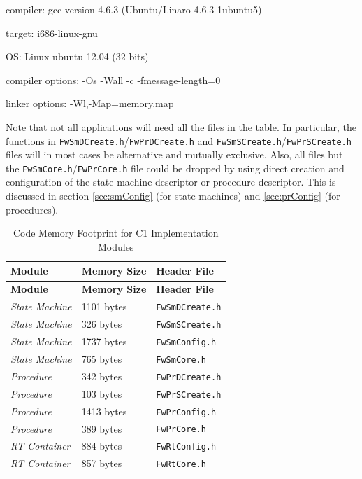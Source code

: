 \documentclass[a4paper,10pt]{article}
\newenvironment{fw_itemize}						%
{\begin{itemize}
  \setlength{\itemsep}{1mm}
  \setlength{\parskip}{0pt}
  \setlength{\parsep}{0pt}}
{\end{itemize}}
\begin{document}
\begin{fw_itemize}
\item{compiler}: gcc version 4.6.3 (Ubuntu/Linaro 4.6.3-1ubuntu5)
\item{target}: i686-linux-gnu
\item{OS}: Linux ubuntu 12.04 (32 bits)
\item{compiler options}: -Os -Wall -c -fmessage-length=0
\item{linker options}: -Wl,-Map=memory.map
\end{fw_itemize}

Note that not all applications will need all the files in the table. In particular, the functions in \texttt{FwSmDCreate.h}/\texttt{FwPrDCreate.h} and \texttt{FwSmSCreate.h}/\texttt{FwPrSCreate.h} files will in 
most cases be alternative and mutually exclusive. Also, all files but 
the \texttt{FwSmCore.h}/\texttt{FwPrCore.h} file could be dropped by using direct creation and configuration of 
the state machine descriptor or procedure descriptor. This is discussed in section \ref{sec:smConfig} (for
state machines) and \ref{sec:prConfig} (for procedures).

\begin{longtable}{|p{2.7cm}|p{2.7cm}|p{2.7cm}|}
\caption{Code Memory Footprint for C1 Implementation Modules} \label{tab:memFootprint}\\
\rowcolor{light-gray}
\textbf{Module} & \textbf{Memory Size} & \textbf{Header File} \\
\hline\hline
\endfirsthead
\rowcolor{light-gray}
\textbf{Module} & \textbf{Memory Size} & \textbf{Header File} \\
\hline\hline
\endhead
\emph{State Machine} & 1101 bytes & \texttt{FwSmDCreate.h} \\
\hline
\emph{State Machine} & 326 bytes & \texttt{FwSmSCreate.h} \\
\hline
\emph{State Machine} & 1737 bytes & \texttt{FwSmConfig.h} \\
\hline
\emph{State Machine} & 765 bytes & \texttt{FwSmCore.h} \\
\hline
\emph{Procedure} & 342 bytes & \texttt{FwPrDCreate.h} \\
\hline
\emph{Procedure} & 103 bytes & \texttt{FwPrSCreate.h} \\
\hline
\emph{Procedure} & 1413 bytes & \texttt{FwPrConfig.h} \\
\hline
\emph{Procedure} & 389 bytes & \texttt{FwPrCore.h} \\
\hline
\emph{RT Container} & 884 bytes & \texttt{FwRtConfig.h} \\
\hline
\emph{RT Container} & 857 bytes & \texttt{FwRtCore.h} \\
\hline
\end{longtable}
\end{document}
